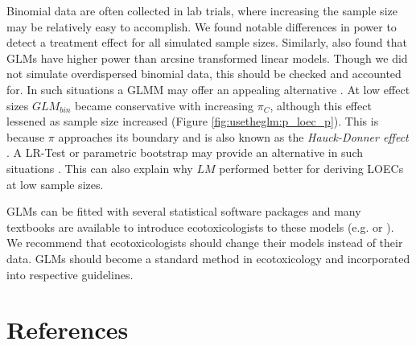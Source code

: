 Binomial data are often collected in lab trials, where increasing the sample size may be relatively easy to accomplish. 
We found notable differences in power to detect a treatment effect for all simulated sample sizes.
Similarly, \citet{warton_arcsine_2011} also found that GLMs have higher power than arcsine transformed linear models.
Though we did not simulate overdispersed binomial data, this should be checked and accounted for.
In such situations a GLMM may offer an appealing alternative \citep{warton_arcsine_2011}.
At low effect sizes $GLM_{bin}$ became conservative with increasing $\pi_C$, although this effect lessened as sample size increased (Figure \ref{fig:usetheglm:p_loec_p}). 
This is because $\pi$ approaches its boundary and is also known as the \emph{Hauck-Donner effect} \citep{hauck_walds_1977}. A LR-Test or parametric bootstrap may provide an alternative in such situations \citep{bolker_generalized_2009}.
This can also explain why $LM$ performed better for deriving LOECs at low sample sizes.

GLMs can be fitted with several statistical software packages and many textbooks are available to introduce ecotoxicologists to these models (e.g. \citealt{zuur_beginners_2013} or \citealt{quinn_experimental_2009}).
We recommend that ecotoxicologists should change their models instead of their data.
GLMs should become a standard method in ecotoxicology and incorporated into respective guidelines.

\section{References}
\printbibliography[heading=none]
